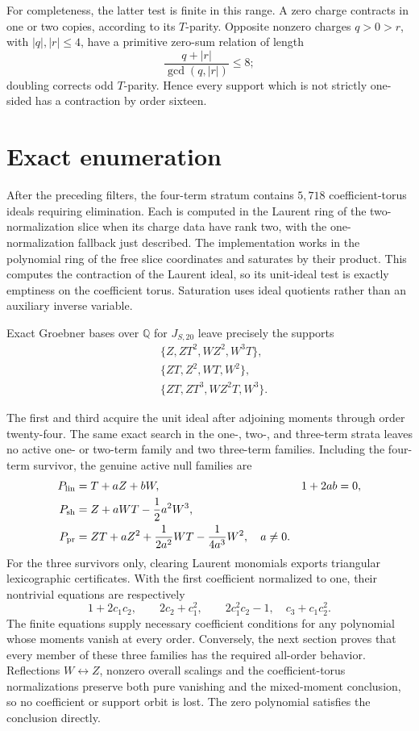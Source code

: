 \documentclass[11pt]{article}
\begin{document}
For completeness, the latter test is finite in this range.  A zero charge
contracts in one or two copies, according to its \(T\)-parity.  Opposite
nonzero charges \(q>0>r\), with \(|q|,|r|\leq4\), have a primitive
zero-sum relation of length
\[
 \frac{q+|r|}{\gcd(q,|r|)}\leq8;
\]
doubling corrects odd \(T\)-parity.  Hence every support which is not
strictly one-sided has a contraction by order sixteen.

\section{Exact enumeration}

After the preceding filters, the four-term stratum contains \(5{,}718\)
coefficient-torus ideals requiring elimination.  Each is computed in the
Laurent ring of the two-normalization slice when its charge data have rank
two, with the one-normalization fallback just described.  The implementation works in the polynomial ring of the free slice
coordinates and saturates by their product.  This computes the contraction
of the Laurent ideal, so its unit-ideal test is exactly emptiness on the
coefficient torus.  Saturation uses ideal quotients rather than an
auxiliary inverse variable.
\begin{samepage}
Exact Groebner bases over \(\mathbb Q\) for \(J_{S,20}\) leave precisely
the supports
\[
\begin{split}
 &\{Z,ZT^2,WZ^2,W^3T\},\\
 &\{ZT,Z^2,WT,W^2\},\\
 &\{ZT,ZT^3,WZ^2T,W^3\}.
\end{split}
\]
\end{samepage}
The first and third acquire the unit ideal after adjoining moments through
order twenty-four.  The same exact search in the one-, two-, and three-term
strata leaves no active one- or two-term family and two three-term
families.  Including the four-term survivor, the genuine active null
families are
\begin{align}
 P_{\rm lin}&=T+aZ+bW,&1+2ab&=0,                 \label{eq:null-linear}\\
 P_{\rm sh}&=Z+aWT-\frac12a^2W^3,                \label{eq:null-shear}\\
 P_{\rm pr}&=ZT+aZ^2+\frac1{2a^2}WT
                    -\frac1{4a^3}W^2,\quad a\neq0. \label{eq:null-product}
\end{align}
For the three survivors only, clearing Laurent monomials exports triangular
lexicographic certificates.  With the first coefficient normalized to one,
their nontrivial equations are respectively
\[
 1+2c_1c_2,\qquad
 2c_2+c_1^2,\qquad
 2c_1^2c_2-1,\quad c_3+c_1c_2^2.
\]
The finite equations supply necessary coefficient conditions for any
polynomial whose moments vanish at every order.  Conversely, the next
section proves that every member of these three families has the required
all-order behavior.  Reflections \(W\leftrightarrow Z\), nonzero overall
scalings and the coefficient-torus normalizations preserve both pure
vanishing and the mixed-moment conclusion, so no coefficient or support
orbit is lost.  The zero polynomial satisfies the conclusion directly.
\end{document}
